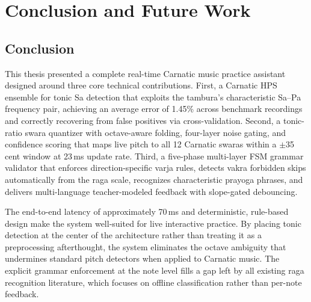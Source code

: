 \documentclass[12pt,a4paper]{report}
\numberwithin{equation}{chapter}
\begin{document}
\chapter{Conclusion and Future Work}
\section{Conclusion}
This thesis presented a complete real-time Carnatic music practice assistant designed around three core technical contributions. First, a Carnatic HPS ensemble for tonic Sa detection that exploits the tambura's characteristic Sa--Pa frequency pair, achieving an average error of 1.45\% across benchmark recordings and correctly recovering from false positives via cross-validation. Second, a tonic-ratio swara quantizer with octave-aware folding, four-layer noise gating, and confidence scoring that maps live pitch to all 12 Carnatic swaras within a $\pm$35 cent window at 23\,ms update rate. Third, a five-phase multi-layer FSM grammar validator that enforces direction-specific varja rules, detects vakra forbidden skips automatically from the raga scale, recognizes characteristic prayoga phrases, and delivers multi-language teacher-modeled feedback with slope-gated debouncing.

The end-to-end latency of approximately 70\,ms and deterministic, rule-based design make the system well-suited for live interactive practice. By placing tonic detection at the center of the architecture rather than treating it as a preprocessing afterthought, the system eliminates the octave ambiguity that undermines standard pitch detectors when applied to Carnatic music. The explicit grammar enforcement at the note level fills a gap left by all existing raga recognition literature, which focuses on offline classification rather than per-note feedback.
\end{document}
